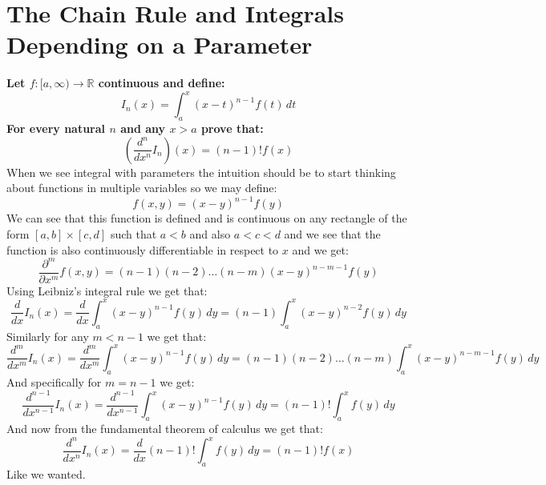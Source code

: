 \documentclass{article}
\theoremstyle{plain}
\newcommand{\R}{\mathbb{R}}
\begin{document}
	\newpage
	
	\section{The Chain Rule and Integrals Depending on a Parameter}
	\textbf{Let $f\colon[a,\infty) \to \R$ continuous and define:
	\[
		I_n(x) = \int_{a}^{x}{(x-t)^{n-1}f(t)\,dt}
	\]
	For every natural $n$ and any $x > a$ prove that:
	\[
		\left(\frac{d^n}{dx^n} I_n\right)(x) = (n-1)! f(x)
	\]}
	When we see integral with parameters the intuition should be to start
	thinking about functions in multiple variables so we may define:
	\[
		f(x,y) = (x-y)^{n-1}f(y)
	\]
	We can see that this function is defined and is continuous on any 
	rectangle of the form $[a,b]\times[c,d]$ such that $a < b$ and also
	$a < c < d$ and we see that the function is also continuously 
	differentiable in respect to $x$ and we get:
	\[
		\frac{\partial^m}{\partial x^m}f(x,y) = 
		(n-1)(n-2)\dots(n-m)(x-y)^{n-m-1}f(y)
	\]
	Using Leibniz's integral rule we get that:
	\[
		\frac{d}{dx}I_n(x) = 
		\frac{d}{dx}\int_{a}^{x}{(x-y)^{n-1}f(y)\,dy} = 
		(n-1)\int_{a}^{x}{(x-y)^{n-2}f(y)\,dy}
	\]
	Similarly for any $m < n-1$ we get that:
	\[
		\frac{d^m}{dx^m}I_n(x) = 
		\frac{d^m}{dx^m}\int_{a}^{x}{(x-y)^{n-1}f(y)\,dy} = 
		(n-1)(n-2)\dots(n-m)\int_{a}^{x}{(x-y)^{n-m-1}f(y)\,dy}
	\]
	And specifically for $m = n - 1$ we get:
	\[
		\frac{d^{n-1}}{dx^{n-1}}I_n(x) = 
		\frac{d^{n-1}}{dx^{n-1}}\int_{a}^{x}{(x-y)^{n-1}f(y)\,dy} = 
		(n-1)!\int_{a}^{x}{f(y)\,dy}
	\]
	And now from the fundamental theorem of calculus we get that:
	\[
		\frac{d^{n}}{dx^{n}}I_n(x) = 
		\frac{d}{dx}(n-1)!\int_{a}^{x}{f(y)\,dy} = 
		(n-1)!f(x)
	\]
	Like we wanted.
	
	\newpage
	
\end{document}
